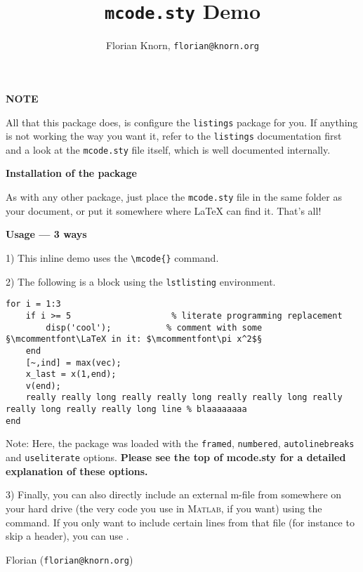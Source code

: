 \documentclass{article}
\title{\texttt{mcode.sty} Demo}
\author{Florian Knorn, \texttt{florian@knorn.org}}
\begin{document}
\maketitle

\textbf{NOTE}

All that this package does, is configure the \verb|listings| package for you. If anything is not working the way you want it, refer to the \verb|listings| documentation first and a look at the \verb|mcode.sty| file itself, which is well documented internally.

\textbf{Installation of the package}

As with any other package, just place the \verb|mcode.sty| file in the same folder as your document, or put it somewhere where \LaTeX{} can find it.  That's all!

\medskip

\textbf{Usage --- 3 ways}

1) This inline demo  uses the \verb|\mcode{}| command.

2) The following is a block using the \verb|lstlisting| environment.
\begin{lstlisting}
for i = 1:3
	if i >= 5                    % literate programming replacement
		disp('cool');           % comment with some §\mcommentfont\LaTeX in it: $\mcommentfont\pi x^2$§
	end
	[~,ind] = max(vec);
	x_last = x(1,end);
	v(end);
	really really long really really long really really long really really long really really long line % blaaaaaaaa
end
\end{lstlisting}
Note: Here, the package was loaded with the \verb|framed|, \verb|numbered|, \verb|autolinebreaks| and \verb|useliterate| options.  \textbf{Please see the top of mcode.sty for a detailed explanation of these options.}


3) Finally, you can also directly include an external m-file from somewhere on your hard drive (the very code you use in \textsc{Matlab}, if you want) using the \verb|| command.  If you only want to include certain lines from that file (for instance to skip a header), you can use \verb||.

\medskip


Florian (\texttt{florian@knorn.org})
\end{document}
